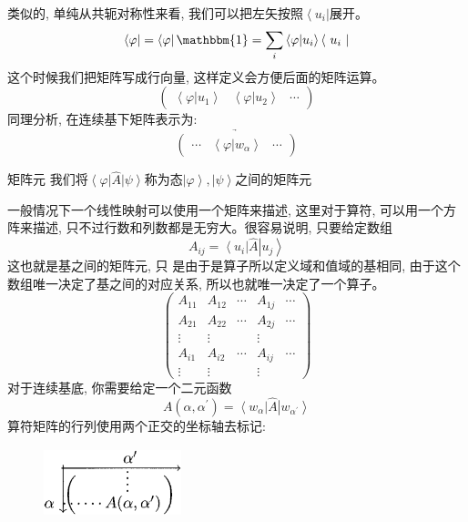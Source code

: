 类似的, 单纯从共轭对称性来看, 我们可以把左矢按照${\left\langle u_i\right|}$展开。
\[\left\langle\varphi\right|=\left\langle\varphi\right|\mathbbm{1}=\sum\limits_{i}\left\langle\varphi| u_i\right\rangle\left\langle u_i \right| \]
这个时候我们把矩阵写成行向量, 这样定义会方便后面的矩阵运算。
\begin{equation*}
    \begin{pmatrix}
        \left \langle \varphi  | u_1 \right \rangle& \left \langle \varphi  | u_2 \right \rangle &\cdots
    \end{pmatrix} 
\end{equation*}
同理分析, 在连续基下矩阵表示为:
\begin{equation*}
    \underrightarrow{
        \begin{pmatrix}
        \cdots& \left \langle \varphi  | w_\alpha  \right \rangle &\cdots
        \end{pmatrix} 
    }
\end{equation*}
\begin{define}{矩阵元}
    我们将$\left \langle \varphi  \right |\hat A\left| \psi  \right \rangle $称为态$\left | \varphi  \right \rangle ,\left | \psi  \right \rangle $之间的矩阵元
\end{define}
一般情况下一个线性映射可以使用一个矩阵来描述, 这里对于算符, 可以用一个方阵来描述, 只不过行数和列数都是无穷大。很容易说明, 只要给定数组\[A_{ij}=\left \langle u_i  \right |\hat A\left| u_j  \right \rangle \]这也就是基之间的矩阵元, 只
是由于是算子所以定义域和值域的基相同, 由于这个数组唯一决定了基之间的对应关系, 所以也就唯一决定了一个算子。
\begin{equation*}
    \left(\begin{array}{ccccc}
        A_{11} & A_{12} & \cdots & A_{1 j} & \cdots \\
        A_{21} & A_{22} & \cdots & A_{2 j} & \cdots \\
        \vdots & \vdots & & \vdots & \\
        A_{i 1} & A_{i 2} & \cdots & A_{i j} & \cdots \\
        \vdots & \vdots & & \vdots &
        \end{array}\right)
\end{equation*}
对于连续基底, 你需要给定一个二元函数\[A\left(\alpha,\alpha^\prime\right)=\left \langle w_\alpha \right |\hat A\left| w_{\alpha^\prime}  \right \rangle \]
算符矩阵的行列使用两个正交的坐标轴去标记:
\begin{figure}[htbp]
    \centering
    \includegraphics[width=4cm,height=2cm]{fig/b-2.eps}
\end{figure}

